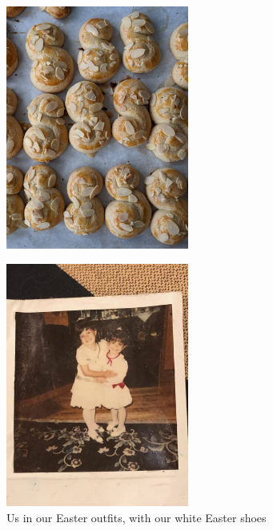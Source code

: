 \begin{figure}
  \includegraphics[width=60mm]{monanteras/images/Easter koulourakia.jpg}
\end{figure}

\begin{figure}
  \includegraphics[width=60mm]{monanteras/images/IMG_20241009_171710.jpg}
  \caption{Us in our Easter outfits, with our white Easter shoes}
\end{figure}
